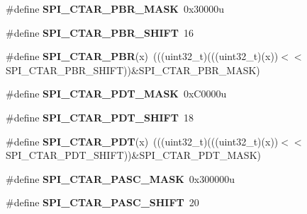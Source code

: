 \begin{DoxyCompactItemize}
\item 
\#define {\bfseries S\+P\+I\+\_\+\+C\+T\+A\+R\+\_\+\+P\+B\+R\+\_\+\+M\+A\+SK}~0x30000u\hypertarget{group__SPI__Register__Masks_ga4f40ea2ab0d14559523ab0699fd682c6}{}\label{group__SPI__Register__Masks_ga4f40ea2ab0d14559523ab0699fd682c6}

\item 
\#define {\bfseries S\+P\+I\+\_\+\+C\+T\+A\+R\+\_\+\+P\+B\+R\+\_\+\+S\+H\+I\+FT}~16\hypertarget{group__SPI__Register__Masks_gaf53f764d59da1c7a68c9185a71dfec66}{}\label{group__SPI__Register__Masks_gaf53f764d59da1c7a68c9185a71dfec66}

\item 
\#define {\bfseries S\+P\+I\+\_\+\+C\+T\+A\+R\+\_\+\+P\+BR}(x)~(((uint32\+\_\+t)(((uint32\+\_\+t)(x))$<$$<$S\+P\+I\+\_\+\+C\+T\+A\+R\+\_\+\+P\+B\+R\+\_\+\+S\+H\+I\+FT))\&S\+P\+I\+\_\+\+C\+T\+A\+R\+\_\+\+P\+B\+R\+\_\+\+M\+A\+SK)\hypertarget{group__SPI__Register__Masks_ga32e4047abbaf3dcf3d1cb2ab30142442}{}\label{group__SPI__Register__Masks_ga32e4047abbaf3dcf3d1cb2ab30142442}

\item 
\#define {\bfseries S\+P\+I\+\_\+\+C\+T\+A\+R\+\_\+\+P\+D\+T\+\_\+\+M\+A\+SK}~0x\+C0000u\hypertarget{group__SPI__Register__Masks_ga3680f8dc0308705f06e234914edfa14b}{}\label{group__SPI__Register__Masks_ga3680f8dc0308705f06e234914edfa14b}

\item 
\#define {\bfseries S\+P\+I\+\_\+\+C\+T\+A\+R\+\_\+\+P\+D\+T\+\_\+\+S\+H\+I\+FT}~18\hypertarget{group__SPI__Register__Masks_ga4201dd4e39a23f36fc01eb3f74b7c094}{}\label{group__SPI__Register__Masks_ga4201dd4e39a23f36fc01eb3f74b7c094}

\item 
\#define {\bfseries S\+P\+I\+\_\+\+C\+T\+A\+R\+\_\+\+P\+DT}(x)~(((uint32\+\_\+t)(((uint32\+\_\+t)(x))$<$$<$S\+P\+I\+\_\+\+C\+T\+A\+R\+\_\+\+P\+D\+T\+\_\+\+S\+H\+I\+FT))\&S\+P\+I\+\_\+\+C\+T\+A\+R\+\_\+\+P\+D\+T\+\_\+\+M\+A\+SK)\hypertarget{group__SPI__Register__Masks_ga9b8b72764c75d047a2b4deb5a6a15619}{}\label{group__SPI__Register__Masks_ga9b8b72764c75d047a2b4deb5a6a15619}

\item 
\#define {\bfseries S\+P\+I\+\_\+\+C\+T\+A\+R\+\_\+\+P\+A\+S\+C\+\_\+\+M\+A\+SK}~0x300000u\hypertarget{group__SPI__Register__Masks_ga3e9fd2ca2e90b6c40db0d51c8d8baa84}{}\label{group__SPI__Register__Masks_ga3e9fd2ca2e90b6c40db0d51c8d8baa84}

\item 
\#define {\bfseries S\+P\+I\+\_\+\+C\+T\+A\+R\+\_\+\+P\+A\+S\+C\+\_\+\+S\+H\+I\+FT}~20\hypertarget{group__SPI__Register__Masks_ga7883643ad4e73cc46c7a140375a2be7a}{}\label{group__SPI__Register__Masks_ga7883643ad4e73cc46c7a140375a2be7a}


\end{DoxyCompactItemize}
